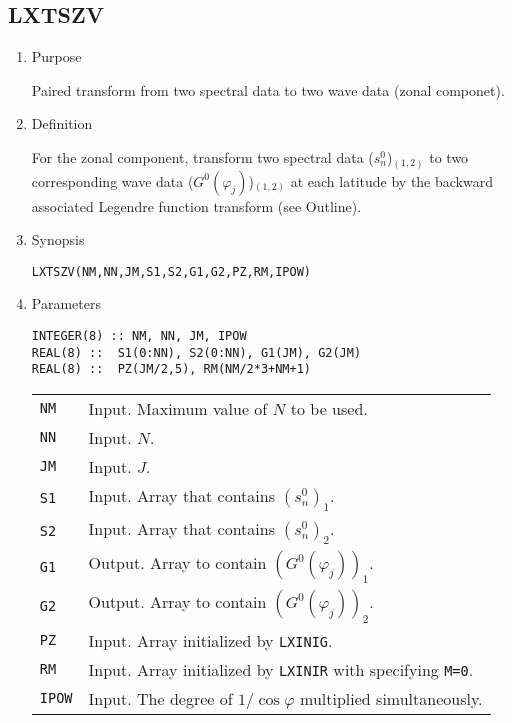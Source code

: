 \documentclass[a4paper]{scrartcl}
\begin{document}

\subsection{LXTSZV}

\begin{enumerate}

\item Purpose

Paired transform from two spectral data to two wave data (zonal componet).

\item Definition

For the zonal component, transform two spectral data ($s^0_n$)$_{(1,2)}$
to two corresponding wave data ($G^0(\varphi_j)$)$_{(1,2)}$ at each latitude
by the backward associated Legendre function transform (see Outline).

\item Synopsis 

\texttt{LXTSZV(NM,NN,JM,S1,S2,G1,G2,PZ,RM,IPOW)}

\item Parameters  
  
\begin{verbatim}  
INTEGER(8) :: NM, NN, JM, IPOW
REAL(8) ::  S1(0:NN), S2(0:NN), G1(JM), G2(JM)
REAL(8) ::  PZ(JM/2,5), RM(NM/2*3+NM+1)
\end{verbatim}

\begin{tabular}{ll}
\texttt{NM} & Input. Maximum value of $N$ to be used.\\
\texttt{NN} & Input. $N$.\\
\texttt{JM} & Input. $J$.\\
\texttt{S1} & Input. Array that contains $(s^0_n)_1$.\\
\texttt{S2} & Input. Array that contains $(s^0_n)_2$.\\
\texttt{G1} & Output. Array to contain $(G^0(\varphi_j))_1$.\\
\texttt{G2} & Output. Array to contain $(G^0(\varphi_j))_2$.\\
\texttt{PZ}  & Input. Array initialized by \texttt{LXINIG}.\\
\texttt{RM} & Input. Array initialized by \texttt{LXINIR}
with specifying \texttt{M=0}.\\
\texttt{IPOW} & Input. 
The degree of $1/\cos\varphi$ multiplied 
simultaneously.\\
\end{tabular}


\end{enumerate}
\end{document}
